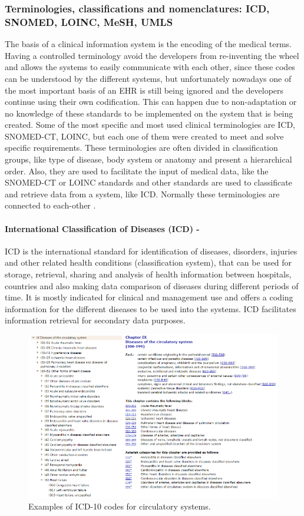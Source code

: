 \documentclass[mim_thesis.tex]{subfiles}
\begin{document}
\subsubsection{Terminologies, classifications and nomenclatures: ICD, SNOMED, LOINC, MeSH, UMLS }
The basis of a clinical information system is the encoding of the medical terms. Having a controlled terminology avoid the developers from re-inventing the wheel and allows the systems to easily communicate with each other, since these codes can be understood by the different systems, but unfortunately nowadays one of the most important basis of an EHR is still being ignored and the developers continue using their own codification. This can happen due to non-adaptation or no knowledge of these standards to be implemented on the system that is being created. Some of the most specific and most used clinical terminologies are ICD, SNOMED-CT, LOINC, but each one of them were created to meet and solve specific requirements. These terminologies are often divided in classification groups, like type of disease, body system or anatomy and present a hierarchical order. Also, they are used to facilitate the input of medical data, like the SNOMED-CT or LOINC standards and other standards are used to classificate and retrieve data from a system, like ICD. Normally these terminologies are connected to each-other \citep{Bowman2005CoordinationOS}.

\paragraph{\textbf{International Classification of Diseases (ICD) -}}
ICD is the international standard for identification of diseases, disorders, injuries and other related health conditions (classification system), that can be used for storage, retrieval, sharing and analysis of health information between hospitals, countries and also making data comparison of diseases during different periods of time. It is mostly indicated for clinical and management use and offers a coding information for the different diseases to be used into the systems. ICD facilitates information retrieval for secondary data purposes.

\begin{figure}[H]
	\centering
    \includegraphics[width=1.1\textwidth]{img/icd.PNG}
	\caption{Examples of ICD-10 codes for circulatory systems.}
	\label{fig:icd_10}
\end{figure}
\end{document}
